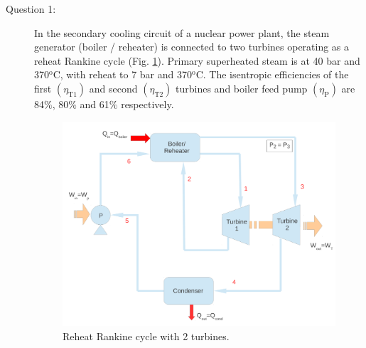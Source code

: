 \documentclass[12pt,twoside]{report}
\begin{document}
\setcounter{page}{1}

\vfill

\pagebreak


\begin{description}

\item [Question 1:] In the secondary cooling circuit of a nuclear power plant, the steam generator (boiler / reheater) is connected to two turbines operating as a reheat Rankine cycle (Fig. \ref{exam_mod01_rankinecycle}). Primary superheated steam is at 40 bar and 370$^{\text{o}}$C, with reheat to 7 bar and 370$^{\text{o}}$C. The isentropic efficiencies of the first $\left(\eta_{\text{T1}}\right)$ and second $\left(\eta_{\text{T2}}\right)$ turbines and boiler feed pump $\left(\eta_{\text{P}}\right)$ are 84$\%$, 80$\%$ and 61$\%$ respectively.


\begin{figure}[h]
\begin{center}
\includegraphics[width=13.cm,clip]{./Pics/Exam_Reheat_Rankine_Cycle}
\caption{ Reheat Rankine cycle with 2 turbines.}
\label{exam_mod01_rankinecycle}
\end{center}
\end{figure}



\end{description}
\end{document}
